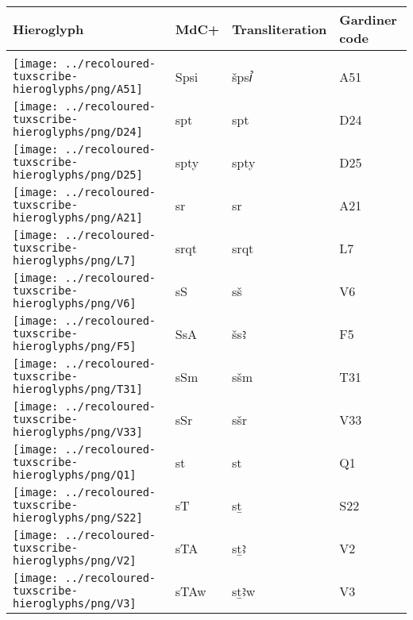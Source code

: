 \begin{center}
	\begin{tabularx}{\linewidth}{YYYY}
		Hieroglyph & MdC+ & Transliteration & Gardiner code\\
		\hline\\
		\texttt{[image: ../recoloured-tuxscribe-hieroglyphs/png/A51]} & Spsi & špsꞽ & A51 \\ 
		\texttt{[image: ../recoloured-tuxscribe-hieroglyphs/png/D24]} & spt & spt & D24 \\ 
		\texttt{[image: ../recoloured-tuxscribe-hieroglyphs/png/D25]} & spty & spty & D25 \\ 
		\texttt{[image: ../recoloured-tuxscribe-hieroglyphs/png/A21]} & sr & sr & A21 \\ 
		\texttt{[image: ../recoloured-tuxscribe-hieroglyphs/png/L7]} & srqt & srqt & L7 \\ 
		\texttt{[image: ../recoloured-tuxscribe-hieroglyphs/png/V6]} & sS & sš & V6 \\ 
		\texttt{[image: ../recoloured-tuxscribe-hieroglyphs/png/F5]} & SsA & šsꜣ & F5 \\ 
		\texttt{[image: ../recoloured-tuxscribe-hieroglyphs/png/T31]} & sSm & sšm & T31 \\ 
		\texttt{[image: ../recoloured-tuxscribe-hieroglyphs/png/V33]} & sSr & sšr & V33 \\ 
		\texttt{[image: ../recoloured-tuxscribe-hieroglyphs/png/Q1]} & st & st & Q1 \\ 
		\texttt{[image: ../recoloured-tuxscribe-hieroglyphs/png/S22]} & sT & sṯ & S22 \\ 
		\texttt{[image: ../recoloured-tuxscribe-hieroglyphs/png/V2]} & sTA & sṯꜣ & V2 \\ 
		\texttt{[image: ../recoloured-tuxscribe-hieroglyphs/png/V3]} & sTAw & sṯꜣw & V3 \\ 
	\end{tabularx}
\end{center}



